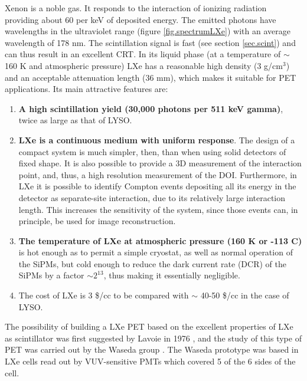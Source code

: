 \documentclass[review]{elsarticle}
\begin{document}
Xenon is a noble gas. It responds to the interaction of ionizing radiation providing about 60 per keV of deposited energy. The emitted photons have wavelengths in the ultraviolet range 
(figure \ref{fig.spectrumLXe}) with an average wavelength of 178 nm. The scintillation signal is fast 
(see section \ref{sec.scint}) and can thus result in an excellent CRT.  In its liquid phase (at a temperature of $\sim$ 160 K and atmospheric pressure) LXe has a reasonable high density (3 g/cm$^3$) and an acceptable attenuation length (36 mm), which makes it suitable for PET applications. Its main attractive features are:

\begin{enumerate}
\item {\bf A high scintillation yield (30,000 photons per 511 keV gamma)}, twice as large as that of LYSO. 
\item {\bf LXe is a continuous medium with uniform response}. The design of a compact system is much simpler, then, than when using solid detectors of fixed shape. It is also possible to provide a 3D measurement of the interaction point, and, thus, a high resolution measurement of the DOI. Furthermore, in LXe it is possible to identify Compton events depositing all its energy in the detector as separate-site interaction, due to its relatively large interaction length. This increases the sensitivity of the system, since those events can, in principle, be used for image reconstruction. 
\item {\bf The temperature of LXe at atmospheric pressure (160 K or -113 C)} is hot enough as to permit a simple cryostat, as well as normal operation of the SiPMs, but cold enough to reduce the dark current rate (DCR) of the SiPMs by a factor $\sim 2^{13}$, thus making it essentially negligible. 
\item {The cost} of LXe is 3 \$/cc to be compared with $\sim$ 40-50 \$/cc in the case of LYSO. 
 \end{enumerate}

The possibility of building a LXe PET based on the excellent properties of LXe as scintillator was first suggested by Lavoie in 1976 \cite{lavoie}, and the study of this type of PET was carried out by the Waseda group \cite{Doke1,Nishikido2,Nishikido1}. The Waseda prototype was based in LXe cells read out by VUV-sensitive PMTs which covered 5 of the 6 sides of the cell. 
\end{document}
